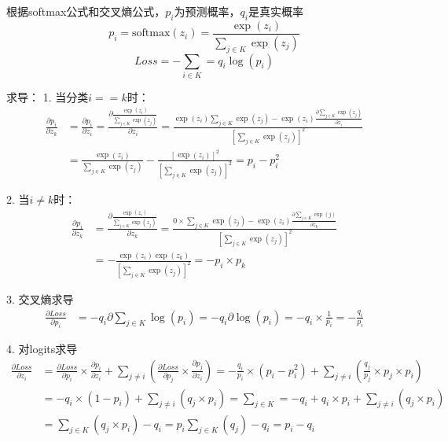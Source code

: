 \documentclass{article}
\begin{document}
\begin{tcolorbox}[title=求导过程]
    根据softmax公式和交叉熵公式，$p_i$为预测概率，$q_i$是真实概率
    $$p_i = \text{softmax}(z_i) = \frac{\exp (z_i)}{\sum_{j \in K} \exp (z_j)}$$
    $$Loss = - \sum_{i\in K} = q_i \log (p_i)$$

    求导：
    1. 当分类$i==k$时：
    \begin{equation*}
        \begin{split}
            \frac{\partial p_i}{\partial z_k} &= \frac{\partial p_i}{\partial z_i} = \frac{\partial \frac{\exp(z_i)}{\sum_{j \in K} \exp (z_j)}}{\partial z_i} = \frac{\exp(z_i)\sum_{j \in K}\exp (z_j) - \exp(z_i)\frac{\partial \sum_{j \in K} \exp(z_j)}{\partial z_i}}{[\sum_{j \in K} \exp (z_j)]^2} \\
            &= \frac{\exp (z_i)}{\sum_{j \in K} \exp(z_j)} - \frac{[\exp (z_i)]^2}{[\sum_{j \in K} \exp (z_j)]^2} = p_i -p_i^2
        \end{split}
    \end{equation*}

    2. 当$i \neq k$时：
    \begin{equation*}
        \begin{split}
            \frac{\partial p_i}{\partial z_k} &= \frac{\partial \frac{\exp (z_i)}{\sum_{j \in K} \exp (z_j)}}{\partial z_k} = \frac{0 \times \sum_{j\in K} \exp(z_j) - \exp(z_i) \frac{\partial \sum_{j \in K} \exp(j)}{\partial z_k}}{[\sum_{j \in K} \exp (z_j)]^2} \\
            &= - \frac{\exp(z_i) \exp (z_k)}{[\sum_{j \in K} \exp(z_j)]^2} = -p_i \times p_k
        \end{split}
    \end{equation*}

    3. 交叉熵求导
    \begin{equation*}
        \begin{split}
            \frac{\partial Loss}{\partial p_i} &= -q_i \partial \sum_{j\in K} \log (p_i) = -q_i \partial \log (p_i) = - q_i \times \frac{1}{p_i} = - \frac{q_i}{p_i}
        \end{split}
    \end{equation*}

    4. 对logits求导
    \begin{equation*}
        \begin{split}
            \frac{\partial Loss}{\partial z_i} &= \frac{\partial Loss}{\partial p_i} \times \frac{\partial p_i}{\partial z_i} + \sum_{j \neq i}(\frac{\partial Loss}{\partial p_j} \times \frac{\partial p_j}{\partial z_i}) = - \frac{q_i}{p_i} \times (p_i - p_i^2) + \sum_{j \neq i} (\frac{q_j}{p_j} \times p_j \times p_i) \\
            &= -q_i \times(1-p_i) + \sum_{j \neq i}(q_j \times p_i) = \sum_{j \in K} = -q_i + q_i \times p_i + \sum_{j \neq i}(q_j \times p_i) \\
            &= \sum_{j \in K} (q_j \times p_i) - q_i = p_i \sum_{j \in K}(q_j) - q_i = p_i-q_i
        \end{split}
    \end{equation*}
\end{tcolorbox}
\end{document}
